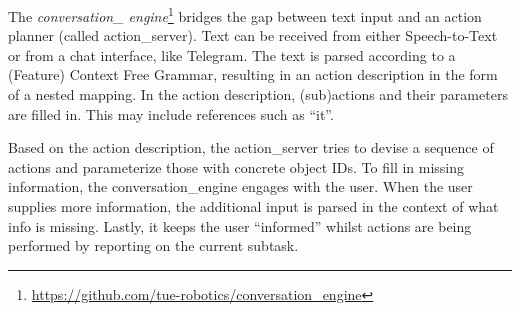 \label{ssec:conversation}
\noindent The \emph{conversation\_ engine}\footnote{\url{https://github.com/tue-robotics/conversation_engine}} bridges the gap between text input and an action planner (called action\_server). Text can be received from either Speech-to-Text or from a chat interface, like Telegram\texttrademark\hspace{0em}. The text is parsed according to a (Feature) Context Free Grammar, resulting in an action description in the form of a nested mapping. In the action description, (sub)actions and their parameters are filled in.
This may include references such as “it”.

Based on the action description, the action\_server tries to devise a sequence of actions and parameterize those with concrete object IDs.
To fill in missing information, the conversation\_engine engages with the user. When the user supplies more information, the additional input is parsed in the context of what info is missing. %
Lastly, it keeps the user “informed” whilst actions are being performed by reporting on the current subtask.
